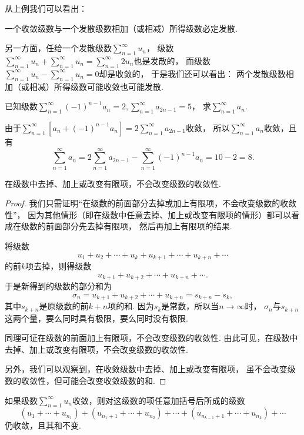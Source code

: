 从上例我们可以看出：
\begin{proposition}\label{theorem:无穷级数.收敛级数性质2.推论1}
一个收敛级数与一个发散级数相加（或相减）所得级数必定发散.
\end{proposition}

另一方面，任给一个发散级数\(\sum_{n=1}^\infty u_n\)，
级数\(\sum_{n=1}^\infty u_n + \sum_{n=1}^\infty u_n
= \sum_{n=1}^\infty 2 u_n\)也是发散的，
而级数\(\sum_{n=1}^\infty u_n - \sum_{n=1}^\infty u_n
= 0\)却是收敛的，
于是我们还可以看出：
{\color{red}两个发散级数相加（或相减）所得级数可能收敛也可能发散.}

\begin{example}
已知级数\(\sum_{n=1}^\infty (-1)^{n-1} a_n = 2,
\sum_{n=1}^\infty a_{2n-1} = 5\)，
求\(\sum_{n=1}^\infty a_n\).
\begin{solution}
由于\(\sum_{n=1}^\infty [a_n + (-1)^{n-1} a_n]
= 2 \sum_{n=1}^\infty a_{2n-1}\)收敛，
所以\(\sum_{n=1}^\infty a_n\)收敛，且有
\[
\sum_{n=1}^\infty a_n
= 2 \sum_{n=1}^\infty a_{2n-1}
- \sum_{n=1}^\infty (-1)^{n-1} a_n
= 10 - 2 = 8.
\]
\end{solution}
\end{example}

\begin{property}\label{theorem:无穷级数.收敛级数性质3}
在级数中去掉、加上或改变有限项，不会改变级数的收敛性.
\begin{proof}
我们只需证明“在级数的前面部分去掉或加上有限项，不会改变级数的收敛性”，
因为其他情形（即在级数中任意去掉、加上或改变有限项的情形）都可以看成在级数的前面部分先去掉有限项，
然后再加上有限项的结果.

将级数\[
u_1+u_2+\dotsb+u_k+u_{k+1}+\dotsb+u_{k+n}+\dotsb
\]的前\(k\)项去掉，则得级数\[
u_{k+1}+u_{k+2}+\dotsb+u_{k+n}+\dotsb.
\]于是新得到的级数的部分和为\[
\sigma_n = u_{k+1}+u_{k+2}+\dotsb+u_{k+n} = s_{k+n} - s_k,
\]其中\(s_{k+n}\)是原级数的前\(k+n\)项的和.
因为\(s_k\)是常数，所以当\(n\to\infty\)时，
\(\sigma_n\)与\(s_{k+n}\)这两个量，要么同时具有极限，要么同时没有极限.

同理可证在级数的前面加上有限项，不会改变级数的收敛性.
由此可见，在级数中去掉、加上或改变有限项，不会改变级数的收敛性.

另外，我们可以观察到，在收敛级数中去掉、加上或改变有限项，
虽不会改变级数的收敛性，但可能会改变收敛级数的和.
\end{proof}
\end{property}

\begin{property}\label{theorem:无穷级数.收敛级数性质4}
如果级数\(\sum_{n=1}^\infty u_n\)收敛，则对这级数的项任意加括号后所成的级数\[
(u_1+\dotsb+u_{n_1}) + (u_{n_1+1}+\dotsb+u_{n_2}) + \dotsb + (u_{n_{k-1}+1}+\dotsb+u_{n_k}) + \dotsb
\]仍收敛，且其和不变.
\end{property}

